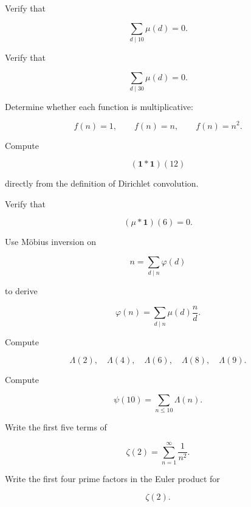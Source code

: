 \begin{exercise}[2]
Verify that

\[ \sum_{d\mid10}\mu(d)=0. \]
\end{exercise}

\begin{exercise}[2]
Verify that

\[ \sum_{d\mid30}\mu(d)=0. \]
\end{exercise}

\begin{exercise}[2]
Determine whether each function is multiplicative:

\[
f(n)=1,\qquad
f(n)=n,\qquad
f(n)=n^2.
\]
\end{exercise}

\begin{exercise}[2]
Compute

\[ (\mathbf{1}*\mathbf{1})(12) \]

directly from the definition of Dirichlet convolution.
\end{exercise}

\begin{exercise}[2]
Verify that

\[ (\mu*\mathbf{1})(6)=0. \]
\end{exercise}

\begin{exercise}[3]
Use Möbius inversion on

\[ n=\sum_{d\mid n}\varphi(d) \]

to derive

\[ \varphi(n)=\sum_{d\mid n}\mu(d)\frac nd. \]
\end{exercise}

\begin{exercise}[1]
Compute

\[ \Lambda(2),\quad\Lambda(4),\quad\Lambda(6),\quad\Lambda(8),\quad\Lambda(9). \]
\end{exercise}

\begin{exercise}[2]
Compute

\[ \psi(10)=\sum_{n\leq10}\Lambda(n). \]
\end{exercise}

\begin{exercise}[2]
Write the first five terms of

\[ \zeta(2)=\sum_{n=1}^{\infty}\frac1{n^2}. \]
\end{exercise}

\begin{exercise}[2]
Write the first four prime factors in the Euler product for

\[ \zeta(2). \]
\end{exercise}

